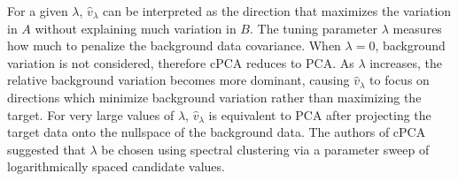 \documentclass[12pt]{article}
\begin{document}
For a given $\lambda$, $\hat{v}_\lambda$ can be interpreted as the direction that maximizes the variation in $A$ without explaining much variation in $B$. The tuning parameter $\lambda$ measures how much to penalize the background data covariance. When $\lambda = 0$, background variation is not considered, therefore cPCA reduces to PCA. As $\lambda$ increases, the relative background variation becomes more dominant, causing $\hat{v}_\lambda$ to focus on directions which minimize background variation rather than maximizing the target. For very large values of $\lambda$, $\hat{v}_\lambda$ is equivalent to PCA after projecting the target data onto the nullspace of the background data.  The authors of cPCA suggested that $\lambda$ be chosen using spectral clustering via a parameter sweep of logarithmically spaced candidate values.
\end{document}
